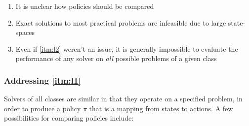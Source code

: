     \begin{enumerate}[label=\textbf{C\arabic*}]
        \item It is unclear how policies should be compared \label{itm:l1}
        \item Exact solutions to most practical problems are infeasible due to large state-spaces \label{itm:l2}
        \item Even if \ref{itm:l2} weren't an issue, it is generally impossible to evaluate the performance of any solver on \emph{all} possible problems \label{itm:l3} of a given class
    \end{enumerate}

    \subsubsection{Addressing \ref{itm:l1}} \label{sec:compare_policies}
        Solvers of all classes are similar in that they operate on a specified problem, in order to produce a policy $\pi$ that is a mapping from states to actions. A few possibilities for comparing policies include:
    
